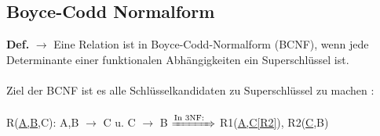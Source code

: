 \documentclass{article}
\newcommand{\DApp}[2]{\textbf{#1} $\rightarrow$ {#2}}
\begin{document}
    \subsection{Boyce-Codd Normalform}
    \noindent\DApp{Def.}{Eine Relation ist in Boyce-Codd-Normalform (BCNF), wenn jede Determinante einer funktionalen Abhängigkeiten ein Superschlüssel ist.}
    \\ \\
    Ziel der BCNF ist es alle Schlüsselkandidaten zu Superschlüssel zu machen : \\ \\
    R(\underline{A,B},C): A,B $\rightarrow$ C u. C $\rightarrow$ B $\xRightarrow{\text{In 3NF:} \; \;}$ R1(\underline{A,C[R2]}), R2(\underline{C},B)
 
\end{document}
